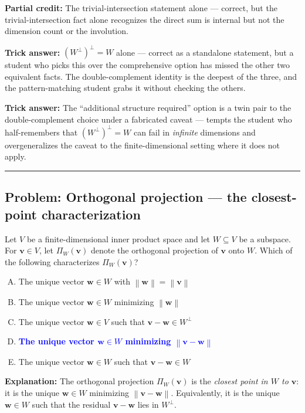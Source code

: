 \documentclass[12pt]{amsart}
\newcommand{\divider}{
  \vspace{-1em}
  \noindent
  \raisebox{-0.15ex}{\textbullet}%
  \hspace{0.5em}%
  \rule[0.5ex]{0.95\textwidth}{1.0pt}%
  \hspace{0.5em}%
  \raisebox{-0.15ex}{\textbullet}%
  \vspace{0em}
}
\newcommand{\norm}[1]{\left\|#1\right\|}
\begin{document}
\textbf{Partial credit:}
The trivial-intersection statement alone --- correct, but the
trivial-intersection fact alone recognizes the direct sum is internal but
not the dimension count or the involution.

\textbf{Trick answer:}
$(W^\perp)^\perp = W$ alone --- correct as a standalone statement, but a
student who picks this over the comprehensive option has missed the other
two equivalent facts. The double-complement identity is the deepest of the
three, and the pattern-matching student grabs it without checking the others.

\textbf{Trick answer:}
The ``additional structure required'' option is a twin pair to the
double-complement choice under a fabricated caveat --- tempts the student
who half-remembers that $(W^\perp)^\perp = W$ can fail in \emph{infinite}
dimensions and overgeneralizes the caveat to the finite-dimensional setting
where it does not apply.

\divider

\subsection*{Problem: Orthogonal projection --- the closest-point characterization}

Let $V$ be a finite-dimensional inner product space and let $W \subseteq V$
be a subspace. For $\mathbf{v} \in V$, let $\Pi_W(\mathbf{v})$ denote the
orthogonal projection of $\mathbf{v}$ onto $W$. Which of the following
characterizes $\Pi_W(\mathbf{v})$?

\begin{enumerate}[(A)]
\item The unique vector $\mathbf{w} \in W$ with $\norm{\mathbf{w}} = \norm{\mathbf{v}}$
\item The unique vector $\mathbf{w} \in W$ minimizing $\norm{\mathbf{w}}$
\item The unique vector $\mathbf{w} \in V$ such that $\mathbf{v} - \mathbf{w} \in W^\perp$
\item \textcolor{blue}{\textbf{The unique vector $\mathbf{w} \in W$ minimizing $\norm{\mathbf{v} - \mathbf{w}}$}}
\item The unique vector $\mathbf{w} \in W$ such that $\mathbf{v} - \mathbf{w} \in W$
\end{enumerate}

\textbf{Explanation:}
The orthogonal projection $\Pi_W(\mathbf{v})$ is the \emph{closest point in
$W$ to $\mathbf{v}$}: it is the unique $\mathbf{w} \in W$ minimizing
$\norm{\mathbf{v} - \mathbf{w}}$. Equivalently, it is the unique
$\mathbf{w} \in W$ such that the residual $\mathbf{v} - \mathbf{w}$ lies
in $W^\perp$.
\end{document}
